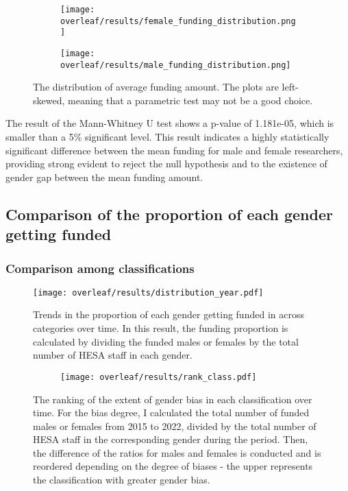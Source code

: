 \begin{figure}
	\centering
   \begin{subfigure}{0.45\textwidth}
       \centering
       \texttt{[image: overleaf/results/female\_funding\_distribution.png]}
   \end{subfigure}
   \begin{subfigure}{0.45\textwidth}
       \centering
       \texttt{[image: overleaf/results/male\_funding\_distribution.png]}
   \end{subfigure}
   \caption{The distribution of average funding amount. The plots are left-skewed, meaning that a parametric test may not be a good choice.}
\end{figure}
The result of the Mann-Whitney U test shows a p-value of 1.181e-05, which is smaller than a 5\% significant level. This result indicates a highly statistically significant difference between the mean funding for male and female researchers, providing strong evident to reject the null hypothesis and to the existence of gender gap between the mean funding amount. 
 
\subsection{Comparison of the proportion of each gender getting funded}

\subsubsection{Comparison among classifications}

\begin{figure}
    \centering
    \texttt{[image: overleaf/results/distribution\_year.pdf]}
    \caption{Trends in the proportion of each gender getting funded in across categories over time. In this result, the funding proportion is calculated by dividing the funded males or females by the total number of HESA staff in each gender.}
\end{figure}


\begin{figure}
	\centering
   \begin{subfigure}{0.75\textwidth}
       \centering
       \texttt{[image: overleaf/results/rank\_class.pdf]}
   \end{subfigure}
   \caption{The ranking of the extent of gender bias in each classification over time. For the bias degree, I calculated the total number of funded males or females from 2015 to 2022, divided by the total number of HESA staff in the corresponding gender during the period. Then, the difference of the ratios for males and females is conducted and is reordered depending on the degree of biases - the upper represents the classification with greater gender bias.}
\end{figure}

